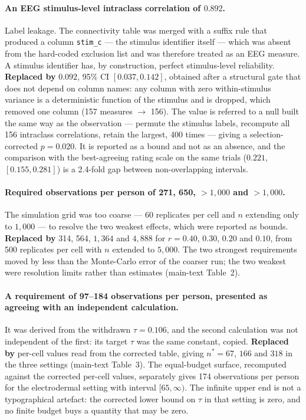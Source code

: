 \paragraph{An EEG stimulus-level intraclass correlation of $0.892$.}
Label leakage. The connectivity table was merged with a suffix rule that produced a
column \texttt{stim\_c} --- the stimulus identifier itself --- which was absent from the
hard-coded exclusion list and was therefore treated as an EEG measure. A stimulus
identifier has, by construction, perfect stimulus-level reliability.
\textbf{Replaced by} $0.092$, 95\% CI $[0.037, 0.142]$, obtained after a structural gate
that does not depend on column names: any column with zero within-stimulus variance is a
deterministic function of the stimulus and is dropped, which removed one column
(157 measures $\rightarrow$ 156). The value is referred to a null built the same way as
the observation --- permute the stimulus labels, recompute all 156 intraclass
correlations, retain the largest, 400 times --- giving a selection-corrected
$p = 0.020$. It is reported as a bound and not as an absence, and the comparison with
the best-agreeing rating scale on the same trials ($0.221$, $[0.155, 0.281]$) is a
2.4-fold gap between non-overlapping intervals.

\paragraph{Required observations per person of 271, 650, $>1{,}000$ and $>1{,}000$.}
The simulation grid was too coarse --- 60 replicates per cell and $n$ extending only to
$1{,}000$ --- to resolve the two weakest effects, which were reported as bounds.
\textbf{Replaced by} 314, 564, $1{,}364$ and $4{,}888$ for $r = 0.40$, $0.30$, $0.20$
and $0.10$, from 500 replicates per cell with $n$ extended to $5{,}000$. The two
strongest requirements moved by less than the Monte-Carlo error of the coarser run;
the two weakest were resolution limits rather than estimates (main-text Table~2).

\paragraph{A requirement of 97--184 observations per person, presented as agreeing with
an independent calculation.}
It was derived from the withdrawn $\tau = 0.106$, and the second calculation was not
independent of the first: its target $\tau$ was the same constant, copied.
\textbf{Replaced by} per-cell values read from the corrected table, giving
$n^{*} = 67$, $166$ and $318$ in the three settings (main-text Table~3). The
equal-budget surface, recomputed against the corrected per-cell values, separately gives
174 observations per person for the electrodermal setting with interval
$[65, \infty)$. The infinite upper end is not a typographical artefact: the corrected
lower bound on $\tau$ in that setting is zero, and no finite budget buys a quantity that
may be zero.

